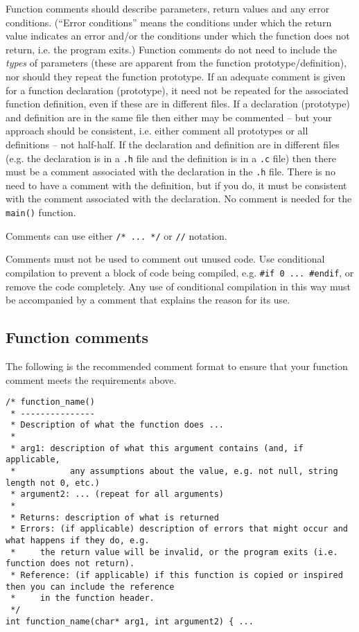 \documentclass{article}
\begin{document}
Function comments should describe parameters, return values and any error conditions. (``Error conditions'' means
the conditions under which the return value indicates an error and/or the conditions under which the 
function does not return, i.e. the program exits.)
Function comments do not need to include the \textit{types} of parameters (these are apparent from the function prototype/definition), 
nor should they repeat the function prototype. If an adequate comment is given for a function 
declaration (prototype), it need not be repeated for the associated function definition, even if these are in 
different files. If a declaration (prototype) and
definition are in the same file then either may be commented -- but your approach should be consistent, i.e. either comment
all prototypes or all definitions -- not half-half. If the declaration and definition are in different files
(e.g. the declaration is in a \texttt{.h} file and the definition is in a \texttt{.c} file) then there must be a comment
associated with the declaration in the \texttt{.h} file. There is no need to have a comment with the definition, 
but if you do, it must be consistent with the comment associated with the declaration.
No comment is needed for the \texttt{main()} function.

Comments can use either \texttt{/* ... */} or \texttt{//} notation.

Comments must not be used to comment out unused code. Use conditional compilation to prevent a block of
code being compiled, e.g. \texttt{\#if 0 ... \#endif}, or remove the code completely. Any use of conditional compilation in
this way must be accompanied by a comment that explains the reason for its use.

\subsection{Function comments}
The following is the recommended comment format to ensure that your function comment meets the requirements above.
\begin{lstlisting}
/* function_name()
 * ---------------
 * Description of what the function does ...
 *
 * arg1: description of what this argument contains (and, if applicable, 
 *           any assumptions about the value, e.g. not null, string length not 0, etc.)
 * argument2: ... (repeat for all arguments)
 *
 * Returns: description of what is returned
 * Errors: (if applicable) description of errors that might occur and what happens if they do, e.g.
 *     the return value will be invalid, or the program exits (i.e. function does not return). 
 * Reference: (if applicable) if this function is copied or inspired then you can include the reference
 *     in the function header.
 */
int function_name(char* arg1, int argument2) { ...
\end{lstlisting}
\end{document}
